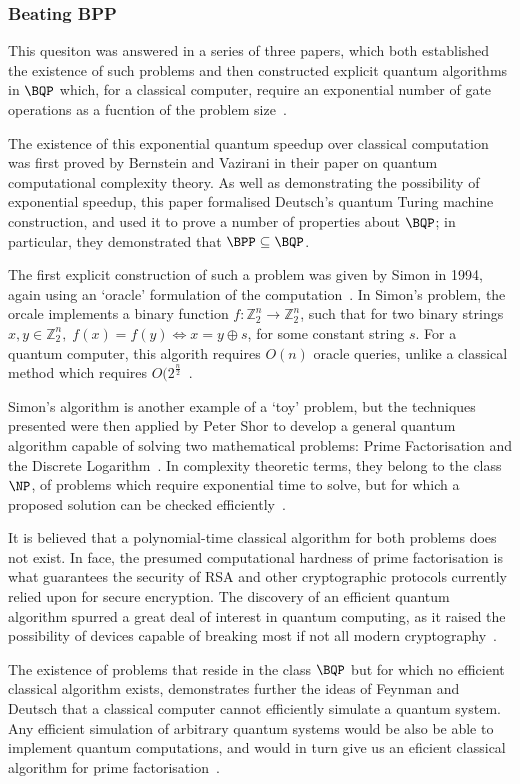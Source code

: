\documentclass{standalone}
\begin{document}
\subsubsection*{Beating BPP}\label{sec:exponentialspeedup}
This quesiton was answered in a series of three papers, which both established the existence of such problems and then constructed explicit quantum algorithms in $\BQP$ which, for a classical computer, require an exponential number of gate operations as a fucntion of the problem size~\cite{Bennett1997}.
\par
The existence of this exponential quantum speedup over classical computation was first proved by Bernstein and Vazirani in their paper on quantum computational complexity theory. As well as demonstrating the possibility of exponential speedup, this paper formalised Deutsch's quantum Turing machine construction, and used it to prove a number of properties about $\BQP$; in particular, they demonstrated that $\BPP\subseteq\BQP$.
\par
The first explicit construction of such a problem was given by Simon in 1994, again using an `oracle' formulation of the computation~\cite{Division1998a}. In Simon's problem, the orcale implements a binary function $f: \mathbb{Z}_{2}^{n}\rightarrow\mathbb{Z}_{2}^{n}$, such that for two binary strings $x,y\in\mathbb{Z}_{2}^{n},\;f(x)=f(y)\Leftrightarrow x = y \oplus s$, for some constant string $s$. For a quantum computer, this algorith requires $O(n)$ oracle queries, unlike a classical method which requires $O(2^{\frac{n}{2}}$~\cite{Division1998a}.
\par
Simon's algorithm is another example of a `toy' problem, but the techniques presented were then applied by Peter Shor to develop a general quantum algorithm capable of solving two mathematical problems: Prime Factorisation and the Discrete Logarithm~\cite{Division1998a,Shor1997}. In complexity theoretic terms, they belong to the class $\NP$, of problems which require exponential time to solve, but for which a proposed solution can be checked efficiently~\cite{Bennett1997}.
\par
It is believed that a polynomial-time classical algorithm for both problems does not exist. In face, the presumed computational hardness of prime factorisation is what guarantees the security of RSA and other cryptographic protocols currently relied upon for secure encryption. The discovery of an efficient quantum algorithm spurred a great deal of interest in quantum computing, as it raised the possibility of devices capable of breaking most if not all modern cryptography~\cite{Shor1997}. 
\par
The existence of problems that reside in the class $\BQP$ but for which no efficient classical algorithm exists, demonstrates further the ideas of Feynman and Deutsch that a classical computer cannot efficiently simulate a quantum system. Any efficient simulation of arbitrary quantum systems would be also be able to implement quantum computations, and would in turn give us an eficient classical algorithm for prime factorisation~\cite{Shor1997}.
\par
\end{document}
